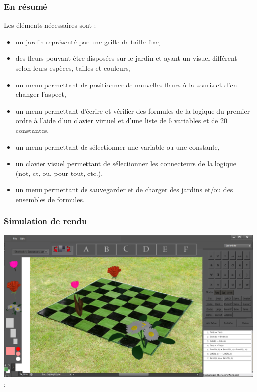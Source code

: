 \documentclass{article}
\theoremstyle{plain}
\theoremstyle{remark}
\begin{document}
\subsubsection{En résumé}
Les éléments nécessaires sont :
\begin{itemize}
	\item un jardin représenté par une grille de taille fixe,
	\item des fleurs pouvant être disposées sur le jardin et ayant
          un visuel différent selon leurs espèces, tailles et
          couleurs,
	\item un menu permettant de positionner de nouvelles fleurs à
          la souris et d'en changer l'aspect,
	\item un menu permettant d'écrire et vérifier des formules de
          la logique du premier ordre à l'aide d'un clavier virtuel et
          d'une liste de 5 variables et de 20 constantes,
	\item un menu permettant de sélectionner une variable ou une
          constante,
	\item un clavier visuel permettant de sélectionner les
          connecteurs de la logique (not, et, ou, pour tout, etc.),
	\item un menu permettant de sauvegarder et de charger des
          jardins et/ou des ensembles de formules.
\end{itemize}

\subsubsection{Simulation de rendu}

\begin{center}
\includegraphics{simulation} ;
\end{center}
\end{document}
